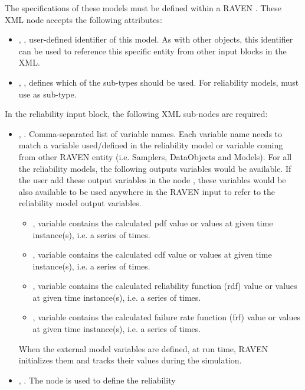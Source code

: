 The specifications of these models must be defined within a RAVEN . These
XML node accepts the following attributes:
\begin{itemize}
	\item {}, , user-defined identifier of this model.
	\nb As with other objects, this identifier can be used to reference this specific entity from other
	input blocks in the XML.
	\item {}, , defines which of the sub-types should
	be used. For reliability models, must use  as sub-type.
\end{itemize}
In the reliability  input block, the following XML sub-nodes are required:
\begin{itemize}
	\item {}, . Comma-separated list of variable
	names. Each variable name needs to match a variable used/defined in the reliability model or variable
	coming from other RAVEN entity (i.e. Samplers, DataObjects and Models).
	\nb For all the reliability models, the following outputs variables would be available. If the user
	add these output variables in the node , these variables would be also available to
	be used anywhere in the RAVEN input to refer to the reliability model output variables.
	\begin{itemize}
		\item {}, variable contains the calculated pdf value or values at given time instance(s),
		i.e. a series of times.
		\item {}, variable contains the calculated cdf value or values at given time instance(s),
		i.e. a series of times.
		\item {}, variable contains the calculated reliability function (rdf) value or values at
		given time instance(s), i.e. a series of times.
		\item {}, variable contains the calculated failure rate function (frf) value or values
		at given time instance(s), i.e. a series of times.
	\end{itemize}
	\nb When the external model variables are defined, at run time, RAVEN initializes
	them and tracks their values during the simulation.
	\item {}, . The node is used to define the reliability

\end{itemize}
